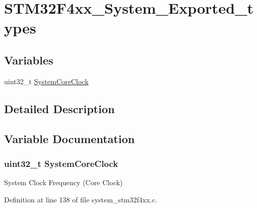 \hypertarget{group___s_t_m32_f4xx___system___exported__types}{}\section{S\+T\+M32\+F4xx\+\_\+\+System\+\_\+\+Exported\+\_\+types}
\label{group___s_t_m32_f4xx___system___exported__types}
\subsection*{Variables}
\begin{DoxyCompactItemize}
\item 
uint32\+\_\+t \hyperlink{group___s_t_m32_f4xx___system___exported__types_gaa3cd3e43291e81e795d642b79b6088e6}{System\+Core\+Clock}
\end{DoxyCompactItemize}


\subsection{Detailed Description}


\subsection{Variable Documentation}
\subsubsection[{\texorpdfstring{System\+Core\+Clock}{SystemCoreClock}}]{\setlength{\rightskip}{0pt plus 5cm}uint32\+\_\+t System\+Core\+Clock}\hypertarget{group___s_t_m32_f4xx___system___exported__types_gaa3cd3e43291e81e795d642b79b6088e6}{}\label{group___s_t_m32_f4xx___system___exported__types_gaa3cd3e43291e81e795d642b79b6088e6}
System Clock Frequency (Core Clock) 

Definition at line 138 of file system\+\_\+stm32f4xx.\+c.

